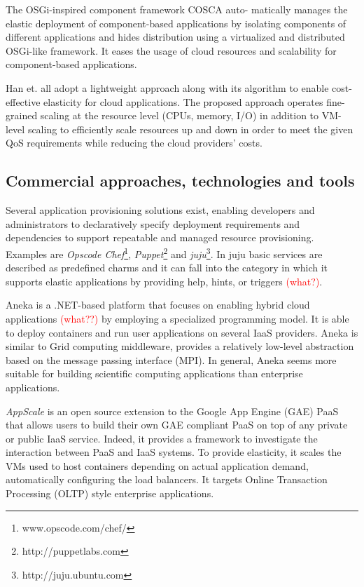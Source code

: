 \documentclass{sig-alternate}
\newcommand\todo[1]{\textcolor{red}{(#1)}}
\begin{document}
The OSGi-inspired component framework COSCA \cite {kachele2013component} auto- matically manages the elastic deployment of component-based applications by isolating components of different applications and hides distribution using a virtualized and distributed OSGi-like framework. It eases the usage of cloud resources and scalability for component-based applications. 

Han et. all \cite{han2012lightweight} adopt a lightweight approach along with its algorithm to enable cost-effective elasticity for cloud applications. The proposed approach operates fine-grained scaling at the resource level (CPUs, memory, I/O) in addition to VM-level scaling to efficiently scale resources up and down in order to meet the given QoS requirements while reducing the cloud providers’ costs.

\subsection{Commercial approaches, technologies and tools}
\label{sec:tools}
Several application provisioning solutions exist, enabling developers and administrators to declaratively specify deployment requirements and dependencies to support repeatable and managed resource provisioning. Examples are \emph{Opscode Chef}\footnote{www.opscode.com/chef/}, \emph{Puppet}\footnote{http://puppetlabs.com} and \emph{juju}\footnote{http://juju.ubuntu.com}. In juju basic services are described as predefined charms and it can fall into the category in which it supports elastic applications by providing help, hints, or triggers \todo{what?}.
 
Aneka \cite{vecchiola2009aneka} is a .NET-based platform that focuses on enabling hybrid cloud applications \todo{what??} by employing a specialized programming model. It is able to deploy containers and run user applications on several IaaS providers. Aneka is similar to Grid computing middleware, provides a relatively low-level abstraction based on the message passing interface (MPI). In general, Aneka seems more suitable for building scientific computing applications than enterprise applications. 

\emph{AppScale} \cite{chohan2009appscale} is an open source extension to the Google App Engine (GAE) PaaS that allows users to build their own GAE compliant PaaS on top of any private or public IaaS service. Indeed, it provides a framework to investigate the interaction between PaaS and IaaS systems. To provide elasticity, it scales the VMs used to host containers depending on actual application demand, automatically configuring the load balancers. It targets Online Transaction Processing (OLTP) style enterprise applications.
\end{document}

